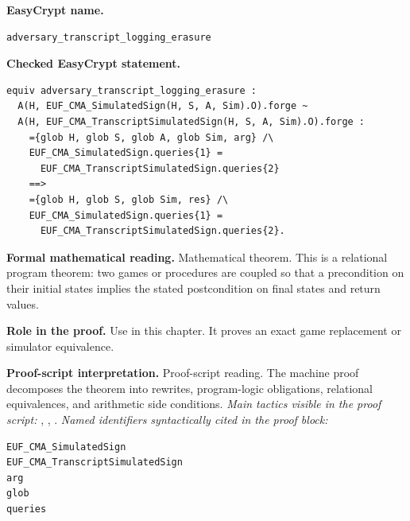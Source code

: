 \begin{formaltheorem}
\noindent\textbf{EasyCrypt name.}
\begin{lstlisting}[language=EasyCrypt,basicstyle=\ttfamily\scriptsize]
adversary_transcript_logging_erasure
\end{lstlisting}
\noindent\textbf{Checked EasyCrypt statement.}
\begin{lstlisting}[language=EasyCrypt,basicstyle=\ttfamily\scriptsize]
equiv adversary_transcript_logging_erasure :
  A(H, EUF_CMA_SimulatedSign(H, S, A, Sim).O).forge ~
  A(H, EUF_CMA_TranscriptSimulatedSign(H, S, A, Sim).O).forge :
    ={glob H, glob S, glob A, glob Sim, arg} /\
    EUF_CMA_SimulatedSign.queries{1} =
      EUF_CMA_TranscriptSimulatedSign.queries{2}
    ==>
    ={glob H, glob S, glob Sim, res} /\
    EUF_CMA_SimulatedSign.queries{1} =
      EUF_CMA_TranscriptSimulatedSign.queries{2}.
\end{lstlisting}
\noindent\textbf{Formal mathematical reading.}
Mathematical theorem. This is a relational program theorem: two games or procedures are coupled so that a precondition on their initial states implies the stated postcondition on final states and return values.

\noindent\textbf{Role in the proof.}
Use in this chapter. It proves an exact game replacement or simulator equivalence.

\noindent\textbf{Proof-script interpretation.}
Proof-script reading. The machine proof decomposes the theorem into rewrites, program-logic obligations, relational equivalences, and arithmetic side conditions.
\emph{Main tactics visible in the proof script:} , , .
\emph{Named identifiers syntactically cited in the proof block:}
\begin{lstlisting}[language=EasyCrypt,basicstyle=\ttfamily\scriptsize]
EUF_CMA_SimulatedSign
EUF_CMA_TranscriptSimulatedSign
arg
glob
queries
\end{lstlisting}

\end{formaltheorem}

